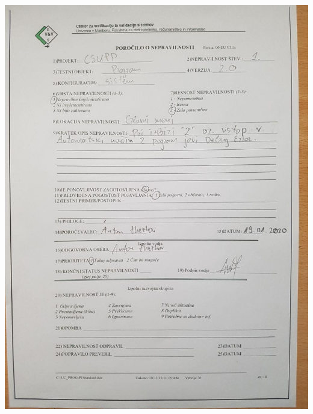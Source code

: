 \documentclass[a4paper,12pt]{article}
\begin{document}
{	\includegraphics[width=15cm]{porocila/08.jpg}
	
\newpage
	
	\hspace{2cm}

	\vspace{2cm}
	
}
\end{document}
